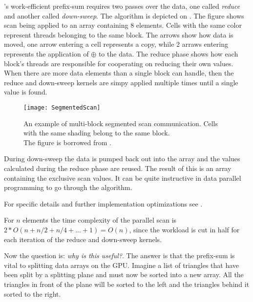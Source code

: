 
\sengupta{}'s work-efficient prefix-sum requires two passes over the
data, one called \textit{reduce} and another called
\textit{down-sweep}. The algorithm is depicted on
. The figure shows scan being applied to an array
containing 8 elements. Cells with the same color represent threads
belonging to the same block. The arrows show how data is moved, one
arrow entering a cell represents a copy, while 2 arraws entering
represents the application of $\oplus$ to the data. The reduce
phase  shows how each block's threads are
responsible for cooperating on reducing their own values. When there
are more data elements than a single block can handle, then the reduce
and down-sweep kernels are simpy applied multiple times until a single
value is found.

\begin{figure}
  \centering
  \texttt{[image: SegmentedScan]}

  \parbox{5cm}{\caption[Multi-block segmented scan communication.]{An
      example of multi-block segmented scan communication. Cells with
      the same shading belong to the same block. \\The figure is
      borrowed from .}\label{fig:segScan}}
\end{figure}

During down-sweep the data is pumped back out into the array and the
values calculated during the reduce phase are reused. The result of
this is an array containing the exclusive scan values. It can be quite
instructive in data parallel programming to go through the algorithm.

For specific details and further implementation optimizations see
\sengupta{}.



For $n$ elements the time complexity of the parallel scan is $2 * O(n
+ n/2 + n/4 + ... + 1) = O(n)$, since the workload is cut in half for
each iteration of the reduce and down-sweep kernels.



Now the question is: \textit{why is this useful?}. The answer is that
the prefix-sum is vital to splitting data arrays on the GPU. Imagine a
list of triangles that have been split by a splitting plane and must
now be sorted into a new array. All the triangles in front of the
plane will be sorted to the left and the triangles behind it sorted to
the right.

